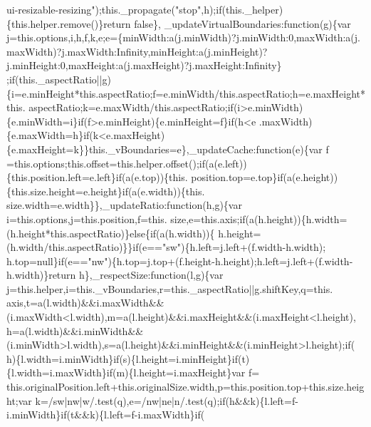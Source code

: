 \begin{DoxyCode}
{      ui-resizable-resizing"});this.\_propagate(\textcolor{stringliteral}{"stop"},h);\textcolor{keywordflow}{if}(this.\_helper)\{this.helper.remove()\}\textcolor{keywordflow}{return} \textcolor{keyword}{false}\},
      \_updateVirtualBoundaries:\textcolor{keyword}{function}(g)\{var j=this.options,i,h,f,k,e;e=\{minWidth:a(j.minWidth)?j.minWidth:0,maxWidth:a(j.
      maxWidth)?j.maxWidth:Infinity,minHeight:a(j.minHeight)?j.minHeight:0,maxHeight:a(j.maxHeight)?j.maxHeight:Infinity\}
      ;\textcolor{keywordflow}{if}(this.\_aspectRatio||g)\{i=e.minHeight*this.aspectRatio;f=e.minWidth/this.aspectRatio;h=e.maxHeight*this.
      aspectRatio;k=e.maxWidth/this.aspectRatio;\textcolor{keywordflow}{if}(i>e.minWidth)\{e.minWidth=i\}\textcolor{keywordflow}{if}(f>e.minHeight)\{e.minHeight=f\}\textcolor{keywordflow}{if}(h<e
      .maxWidth)\{e.maxWidth=h\}\textcolor{keywordflow}{if}(k<e.maxHeight)\{e.maxHeight=k\}\}this.\_vBoundaries=e\},\_updateCache:\textcolor{keyword}{function}(e)\{var f
      =this.options;this.offset=this.helper.offset();\textcolor{keywordflow}{if}(a(e.left))\{this.position.left=e.left\}\textcolor{keywordflow}{if}(a(e.top))\{this.
      position.top=e.top\}\textcolor{keywordflow}{if}(a(e.height))\{this.size.height=e.height\}\textcolor{keywordflow}{if}(a(e.width))\{this.
      size.width=e.width\}\},\_updateRatio:\textcolor{keyword}{function}(h,g)\{var i=this.options,j=this.position,f=this.
      size,e=this.axis;\textcolor{keywordflow}{if}(a(h.height))\{h.width=(h.height*this.aspectRatio)\}\textcolor{keywordflow}{else}\{\textcolor{keywordflow}{if}(a(h.width))\{
      h.height=(h.width/this.aspectRatio)\}\}\textcolor{keywordflow}{if}(e==\textcolor{stringliteral}{"sw"})\{h.left=j.left+(f.width-h.width);
      h.top=null\}\textcolor{keywordflow}{if}(e==\textcolor{stringliteral}{"nw"})\{h.top=j.top+(f.height-h.height);h.left=j.left+(f.width-h.width)\}\textcolor{keywordflow}{return} 
      h\},\_respectSize:\textcolor{keyword}{function}(l,g)\{var j=this.helper,i=this.\_vBoundaries,r=this.\_aspectRatio||g.shiftKey,q=this.
      axis,t=a(l.width)&&i.maxWidth&&(i.maxWidth<l.width),m=a(l.height)&&i.maxHeight&&(i.maxHeight<l.height),
      h=a(l.width)&&i.minWidth&&(i.minWidth>l.width),s=a(l.height)&&i.minHeight&&(i.minHeight>l.height);\textcolor{keywordflow}{if}(
      h)\{l.width=i.minWidth\}\textcolor{keywordflow}{if}(s)\{l.height=i.minHeight\}\textcolor{keywordflow}{if}(t)\{l.width=i.maxWidth\}\textcolor{keywordflow}{if}(m)\{l.height=i.maxHeight\}var f=
      this.originalPosition.left+this.originalSize.width,p=this.position.top+this.size.height;var 
      k=/sw|nw|w/.test(q),e=/nw|ne|n/.test(q);\textcolor{keywordflow}{if}(h&&k)\{l.left=f-i.minWidth\}\textcolor{keywordflow}{if}(t&&k)\{l.left=f-i.maxWidth\}\textcolor{keywordflow}{if}(

\end{DoxyCode}
